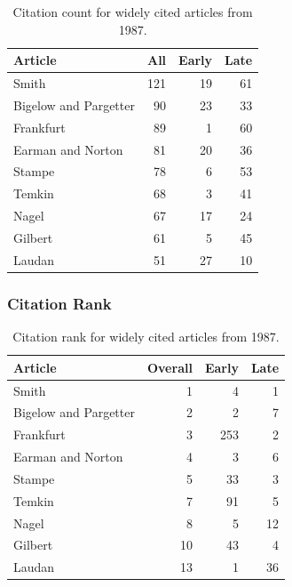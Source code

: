 \documentclass[
  10pt,
  letterpaper,
  DIV=11,
  numbers=noendperiod,
  twoside]{scrartcl}
\begin{document}
\begin{longtable}[]{@{}lrrr@{}}

\caption{\label{tbl-citation-count-1987}Citation count for widely cited
articles from 1987.}

\tabularnewline

\toprule\noalign{}
Article & All & Early & Late \\
\midrule\noalign{}
\endhead
\bottomrule\noalign{}
\endlastfoot
Smith & 121 & 19 & 61 \\
Bigelow and Pargetter & 90 & 23 & 33 \\
Frankfurt & 89 & 1 & 60 \\
Earman and Norton & 81 & 20 & 36 \\
Stampe & 78 & 6 & 53 \\
Temkin & 68 & 3 & 41 \\
Nagel & 67 & 17 & 24 \\
Gilbert & 61 & 5 & 45 \\
Laudan & 51 & 27 & 10 \\

\end{longtable}

\subsubsection*{Citation Rank}\label{citation-rank-11}

\begin{longtable}[]{@{}lrrr@{}}

\caption{\label{tbl-citation-rank-1987}Citation rank for widely cited
articles from 1987.}

\tabularnewline

\toprule\noalign{}
Article & Overall & Early & Late \\
\midrule\noalign{}
\endhead
\bottomrule\noalign{}
\endlastfoot
Smith & 1 & 4 & 1 \\
Bigelow and Pargetter & 2 & 2 & 7 \\
Frankfurt & 3 & 253 & 2 \\
Earman and Norton & 4 & 3 & 6 \\
Stampe & 5 & 33 & 3 \\
Temkin & 7 & 91 & 5 \\
Nagel & 8 & 5 & 12 \\
Gilbert & 10 & 43 & 4 \\
Laudan & 13 & 1 & 36 \\

\end{longtable}
\end{document}
